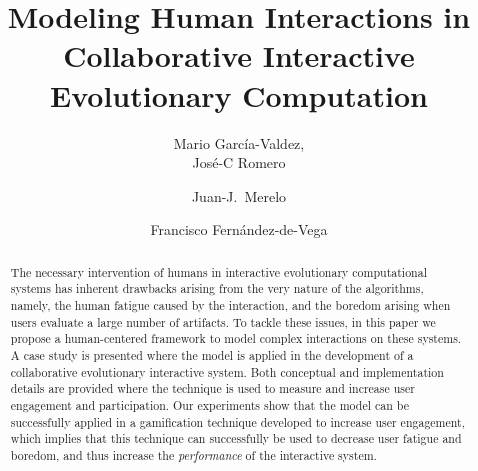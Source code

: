 \documentclass[sigconf]{acmart}
\begin{document}
\title{Modeling Human Interactions in Collaborative Interactive 
 Evolutionary Computation}

\author{Mario Garc\'ia-Valdez,\\ Jos\'e-C  Romero}

\author{Juan-J.~Merelo}

\author{Francisco Fern\'andez-de-Vega}







\begin{abstract}
The necessary intervention of humans in interactive evolutionary
computational systems has inherent drawbacks arising from the very nature of 
the algorithms, namely, the human fatigue caused by the interaction, and
the boredom arising when users evaluate a large number of artifacts.
To tackle these issues, in this paper we
propose a human-centered framework to model complex interactions on these systems.
A case study is presented where the model is applied in the 
development of a collaborative evolutionary interactive system. 
Both conceptual and implementation details are provided where the   
technique is used to measure and increase user engagement and participation.
Our experiments show that the model can be successfully applied in a
gamification technique developed to increase user engagement, which
implies that this technique can successfully be used to 
decrease user fatigue and boredom, and thus increase the {\em performance} of the
interactive system.
\end{abstract}
\end{document}
